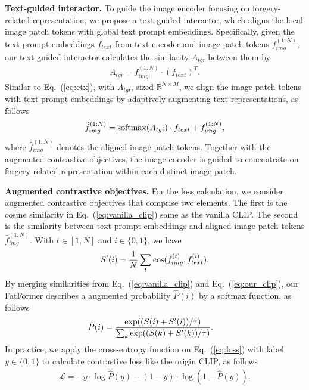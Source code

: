 \documentclass[10pt,twocolumn,letterpaper]{article}
\begin{document}
\noindent \textbf{Text-guided interactor.}
To guide the image encoder focusing on forgery-related representation, we propose a text-guided interactor, which aligns the local image patch tokens with global text prompt embeddings. 
Specifically, given the text prompt embeddings $f_{text}$ from text encoder and image patch tokens $f_{img}^{(1:N)}$, our text-guided interactor calculates the similarity $A_{tgi}$ between them by
\begin{align}
    A_{tgi} =  f_{img}^{(1:N)} \cdot (f_{text})^T.
\end{align}
Similar to Eq.~(\ref{eq:ctx}), with $A_{tgi}$, sized $\mathbb{R}^{N\times M}$, we align the image patch tokens with text prompt embeddings by adaptively augmenting text representations, as follows
\begin{align}
    \hat{f}_{img}^{(1:N)} = {\rm softmax}(A_{tgi}) \cdot f_{text} + f_{img}^{(1:N)},
\end{align}
where $\hat{f}_{img}^{(1:N)}$ denotes the aligned image patch tokens. Together with the augmented contrastive objectives, the image encoder is guided to concentrate on forgery-related representation within each distinct image patch.

\noindent \textbf{Augmented contrastive objectives.} For the loss calculation, we consider augmented contrastive objectives that comprise two elements. 
The first is the cosine similarity in Eq.~(\ref{eq:vanilla_clip}) same as the vanilla CLIP. 
The second is the similarity between text prompt embeddings and aligned image patch tokens $\hat{f}_{img}^{(1:N)}$. With $t \in [1, N]$ and $i \in \{0, 1\}$, we have
\begin{align}
    S'(i) = \frac{1}{N}\sum_{t}{\rm cos}(\hat{f}_{img}^{(t)}, f_{text}^{(i)}).
    \label{eq:our_clip}
\end{align}
By merging similarities from Eq.~(\ref{eq:vanilla_clip}) and Eq.~(\ref{eq:our_clip}), our FatFormer describes a augmented probability $\hat{P}(i)$ by a softmax function, as follows
\begin{align}
    \hat{P}(i) &= \frac{{\rm exp}((S(i) + S'(i)) / \tau)}{\sum_{k} {\rm exp}((S(k) + S'(k)) / \tau)}. \label{eq:loss}
\end{align}
In practice, we apply the cross-entropy function on Eq.~(\ref{eq:loss}) with label $y \in \{0,1\}$ to calculate contrastive loss like the origin CLIP, as follows
\begin{align}
    \mathcal{L} = - y \cdot \log \hat{P}(y)-(1-y) \cdot \log (1-\hat{P}(y)).
\end{align}
\end{document}
